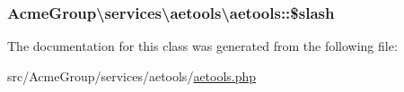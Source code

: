 \hypertarget{class_acme_group_1_1services_1_1aetools_1_1aetools_a25f0ad4a8d164eb015c4ede6350de0f1}{
\subsubsection[{\$slash}]{\setlength{\rightskip}{0pt plus 5cm}Acme\+Group\textbackslash{}services\textbackslash{}aetools\textbackslash{}aetools\+::\$slash\hspace{0.3cm}{\ttfamily [protected]}}}\label{class_acme_group_1_1services_1_1aetools_1_1aetools_a25f0ad4a8d164eb015c4ede6350de0f1}


The documentation for this class was generated from the following file\+:\begin{DoxyCompactItemize}
\item 
src/\+Acme\+Group/services/aetools/\hyperlink{aetools_8php}{aetools.\+php}\end{DoxyCompactItemize}
